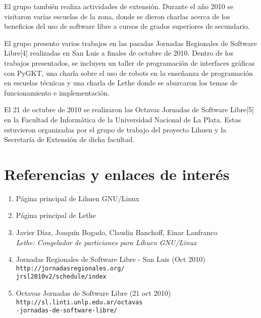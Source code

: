 \documentclass[final,narroweqnarray,inline,twoside]{ieee}
\newcommand{\itref}[1]{[{#1}]}
\begin{document}
El grupo también realiza actividades de extensión. Durante el año 2010 se visitaron varias escuelas de la zona, donde se
dieron charlas acerca de los beneficios del uso de software libre a cursos de grados superiores de secundario.

El grupo presento varios trabajos en las pasadas Jornadas Regionales de Software Libre\itref{4} realizadas en San Luis a
finales de octubre de 2010. Dentro de los trabajos presentados, se incluyen un taller de programación de interfaces gráficas
con PyGKT, una charla sobre el uso de robots en la enseñanza de programación en escuelas técnicas y una charla de Lethe donde
se abarcaron los temas de funcionamiento e implementación.

El 21 de octubre de 2010 se realizaron las Octavas Jornadas de Software Libre\itref{5} en la Facultad de Informática de la
Universidad Nacional de La Plata. Estas estuvieron organizadas por el grupo de trabajo del proyecto Lihuen y la Secretaría de
Extensión de dicha facultad.

\section{Referencias y enlaces de interés}

\begin{enumerate}
\item Página principal de Lihuen GNU/Linux\\
\item Página principal de Lethe\\
\item Javier Díaz, Joaquín Bogado, Claudia Banchoff, Einar Lanfranco
\\\textit{Lethe: Congelador de particiones para Lihuen GNU/Linux}\\
\item Jornadas Regionales de Software Libre - San Luis (Oct 2010)\\
\texttt{http://jornadasregionales.org/\\
jrsl2010v2/schedule/index}
\item Octavas Jornadas de Software Libre (21 oct 2010)\\
\texttt{http://sl.linti.unlp.edu.ar/octavas\\-jornadas-de-software-libre/}
\end{enumerate}
\end{document}
